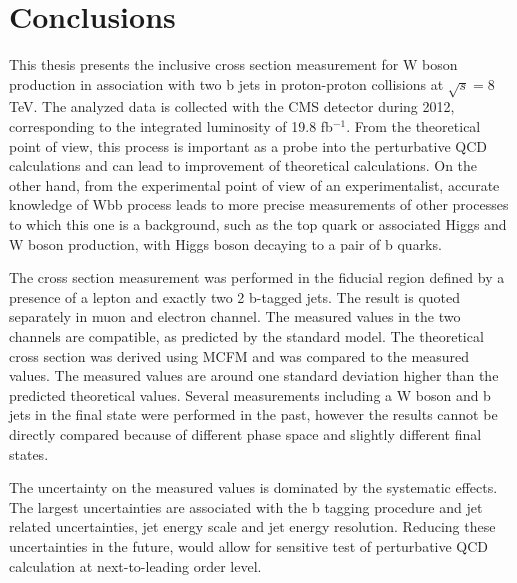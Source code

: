 
\chapter{Conclusions} %

\label{Chapter8} %


This thesis presents the inclusive cross section measurement for W boson production in association with two b jets in proton-proton collisions at $\sqrt{s}=$8 TeV. The analyzed data is collected with the CMS detector during 2012, corresponding to the integrated luminosity of 19.8 fb$^{-1}$. From the theoretical point of view, this process is important as a probe into the perturbative QCD calculations and can lead to improvement of theoretical calculations. On the other hand, from the experimental  point of view of an experimentalist, accurate  knowledge of Wbb process leads to more precise measurements of other processes to which this one is a background, such as the top quark or associated Higgs and W boson production, with Higgs boson  decaying to a pair of b quarks.

\par The cross section measurement was performed in the fiducial region defined by a presence of a lepton and exactly two 2 b-tagged jets. The result is quoted separately in muon and electron channel. The measured values in the two channels are compatible, as predicted by the standard model. The theoretical cross section was derived using MCFM and was compared to the measured values. The measured values are around one standard deviation higher than the predicted theoretical values. Several measurements including a W boson and b jets in the final state were performed in the past, however the results cannot be directly compared because of different phase space and slightly different final states.

The uncertainty on the measured values is dominated by the systematic effects. The largest uncertainties are associated with the b tagging procedure and jet related uncertainties, jet energy scale and jet energy resolution. Reducing these uncertainties in the future, would allow for sensitive test of perturbative QCD calculation at next-to-leading order level.

